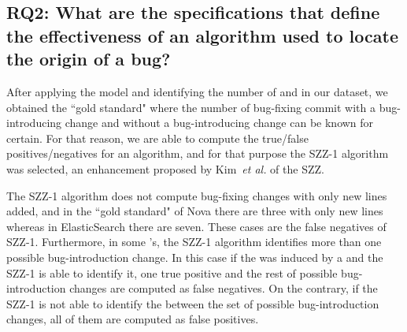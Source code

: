 \documentclass[a4paper, 12pt]{book}
\begin{document}


\vspace{0.2cm}
\vspace{0.1cm}

\subsection{ RQ2: What are the specifications that define the effectiveness of an algorithm used to locate the origin of a bug? }
After applying the model and identifying the number of \BIC and \FFC in our dataset, we obtained the ``gold standard" where the number of bug-fixing commit with a bug-introducing change and without a bug-introducing change can be known for certain. For that reason, we are able to compute the true/false positives/negatives for an algorithm, and for that purpose the SZZ-1 algorithm~\cite{kim2008classifying} was selected, an enhancement proposed by Kim~\textit{et al.} of the SZZ. 

The SZZ-1 algorithm does not compute bug-fixing changes with only new lines added, and in the ``gold standard" of Nova there are three \BFC with only new lines whereas in ElasticSearch there are seven. These cases are the false negatives of SZZ-1. Furthermore, in some \BFC's, the SZZ-1 algorithm identifies more than one possible bug-introduction change. In this case if the \BFC was induced by a \BIC and the SZZ-1 is able to identify it, one true positive and the rest of possible bug-introduction changes are computed as false negatives. On the contrary, if the SZZ-1 is not able to identify the \BIC between the set of possible bug-introduction changes, all of them are computed as false positives.  
\end{document}
